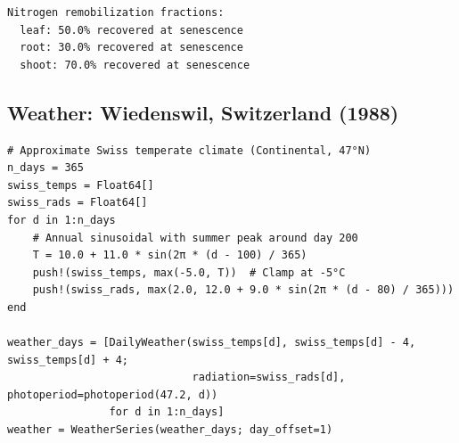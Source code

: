 \begin{verbatim}
Nitrogen remobilization fractions:
  leaf: 50.0% recovered at senescence
  root: 30.0% recovered at senescence
  shoot: 70.0% recovered at senescence
\end{verbatim}



\subsection{Weather: Wiedenswil, Switzerland (1988)}



\label{14931436580864355372}{}



\begin{verbatim}
# Approximate Swiss temperate climate (Continental, 47°N)
n_days = 365
swiss_temps = Float64[]
swiss_rads = Float64[]
for d in 1:n_days
    # Annual sinusoidal with summer peak around day 200
    T = 10.0 + 11.0 * sin(2π * (d - 100) / 365)
    push!(swiss_temps, max(-5.0, T))  # Clamp at -5°C
    push!(swiss_rads, max(2.0, 12.0 + 9.0 * sin(2π * (d - 80) / 365)))
end

weather_days = [DailyWeather(swiss_temps[d], swiss_temps[d] - 4, swiss_temps[d] + 4;
                             radiation=swiss_rads[d], photoperiod=photoperiod(47.2, d))
                for d in 1:n_days]
weather = WeatherSeries(weather_days; day_offset=1)
\end{verbatim}




